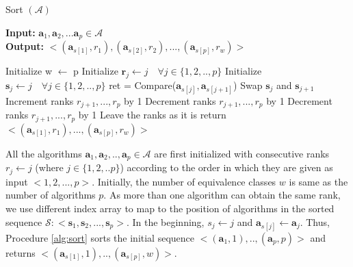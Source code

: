 \documentclass[conference]{IEEEtran}
\begin{document}
\begin{algorithm}
	\caption{Sort $(\mathcal{A})$ }
	\label{alg:sort}
	\hspace*{\algorithmicindent} \textbf{Input: } $ \mathbf{a}_1,\mathbf{a}_2,...\mathbf{a}_p \in \mathcal{A}$ \\
	\hspace*{\algorithmicindent} \textbf{Output: } $ < (\mathbf{a}_{s[1]},r_1), (\mathbf{a}_{s[2]}, r_2), ..., (\mathbf{a}_{s[p]},r_w) > $
	\begin{algorithmic}[1] 
		\State Initialize w $\leftarrow$ p
		\State Initialize $\mathbf{r}_j \leftarrow j \quad \forall j \in \{1,2,..,p\}$ 
		\State Initialize $\mathbf{s}_j \leftarrow j \quad \forall j \in \{1,2,..,p\}$ 
		\State ret = Compare($\mathbf{a}_{s[j]}, \mathbf{a}_{s[j+1]}$)
		\State Swap $\mathbf{s}_{j}$ and $\mathbf{s}_{j+1}$ \label{lst:swap}
		 \label{lst:h1}
		\State Increment ranks $r_{j+1}, ..., r_p$ by 1 \label{lst:h2}
		\EndIf
		\Else
		 \label{lst:gg1}
		\State Decrement ranks $r_{j+1}, ..., r_p$ by 1 \label{lst:gg2}
		\EndIf
		\EndIf
		 \label{lst:ag1}
		\State Decrement ranks $r_{j+1}, ..., r_p$ by 1 \label{lst:ag2}
		\EndIf
		\State Leave the ranks as it is
		\EndIf		
		\EndFor
		\EndFor
		\State return $< (\mathbf{a}_{s[1]},r_1), ..., (\mathbf{a}_{s[p]},r_w) >$
              \end{algorithmic}
\end{algorithm}
All the algorithms $\mathbf{a}_1, \mathbf{a}_2, .., \mathbf{a}_p \in \mathcal{A}$ are first initialized with consecutive ranks $r_j \leftarrow j$ (where $j \in\{1,2,..p\}$) according to the order in which they are given as input $<1,2,...,p> $. Initially, the number of equivalence classes $w$ is same as the number of algorithms $p$. As more than one algorithm can obtain the same rank, we use different index array to map to the position of algorithms in the sorted sequence $\mathcal{S} : < \mathbf{s}_1, \mathbf{s}_2, ..., \mathbf{s}_p >$. In the beginning, $s_j \leftarrow j$ and $ \mathbf{a}_{s[j]} \leftarrow \mathbf{a}_j$. Thus, Procedure \ref{alg:sort} sorts the initial sequence $< (\mathbf{a}_1,1), .., (\mathbf{a}_p,p) >$ and returns $< (\mathbf{a}_{s[1]},1), .., (\mathbf{a}_{s[p]},w) >$.
\end{document}
